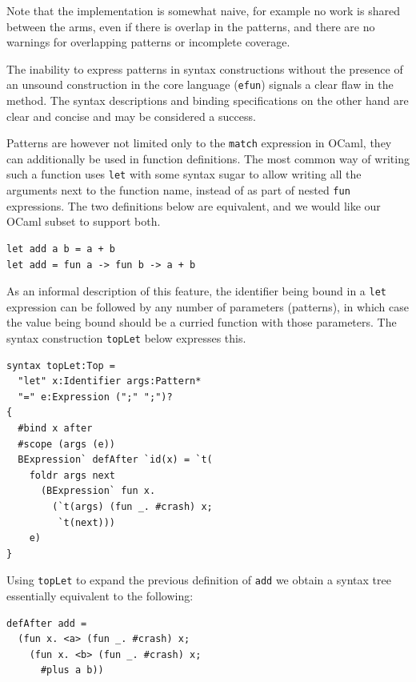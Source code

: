 \documentclass{kththesis}
\begin{document}
Note that the implementation is somewhat naive, for example no work is shared between the arms, even if there is overlap in the patterns, and there are no warnings for overlapping patterns or incomplete coverage.

The inability to express patterns in syntax constructions without the presence of an unsound construction in the core language (\texttt{efun}) signals a clear flaw in the method. The syntax descriptions and binding specifications on the other hand are clear and concise and may be considered a success.

Patterns are however not limited only to the \texttt{match} expression in OCaml, they can additionally be used in function definitions. The most common way of writing such a function uses \texttt{let} with some syntax sugar to allow writing all the arguments next to the function name, instead of as part of nested \texttt{fun} expressions. The two definitions below are equivalent, and we would like our OCaml subset to support both.

\begin{verbatim}
let add a b = a + b
let add = fun a -> fun b -> a + b
\end{verbatim}

As an informal description of this feature, the identifier being bound in a \texttt{let} expression can be followed by any number of parameters (patterns), in which case the value being bound should be a curried function with those parameters. The syntax construction \texttt{topLet} below expresses this.

\begin{verbatim}
syntax topLet:Top =
  "let" x:Identifier args:Pattern*
  "=" e:Expression (";" ";")?
{
  #bind x after
  #scope (args (e))
  BExpression` defAfter `id(x) = `t(
    foldr args next
      (BExpression` fun x.
        (`t(args) (fun _. #crash) x;
         `t(next)))
    e)
}
\end{verbatim}

Using \texttt{topLet} to expand the previous definition of \texttt{add} we obtain a syntax tree essentially equivalent to the following:

\begin{verbatim}
defAfter add =
  (fun x. <a> (fun _. #crash) x;
    (fun x. <b> (fun _. #crash) x;
      #plus a b))
\end{verbatim}
\end{document}
